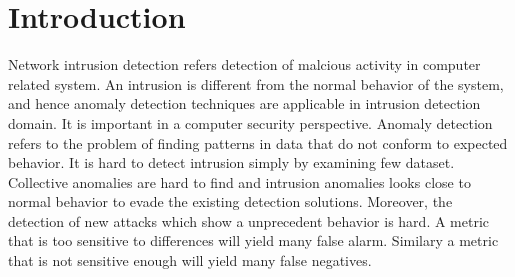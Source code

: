 \section{Introduction}
Network intrusion detection refers detection of malcious activity in computer related system. 
An intrusion is different from the normal behavior of the system, and hence anomaly detection techniques are applicable in intrusion detection domain. \cite{chandola09}
It is important in a computer security perspective. Anomaly detection refers to the problem of finding patterns in data that do not conform to expected behavior\cite{chandola09}. 
It is hard to detect intrusion simply by examining few dataset. 
Collective anomalies are hard to find and intrusion anomalies looks close to normal behavior to evade the existing detection solutions\cite{chandola09}. 
Moreover, the detection of new attacks which show a unprecedent behavior is hard. 
A metric that is too sensitive to differences will yield many false alarm. Similary a metric that is not sensitive enough will yield many false negatives.
